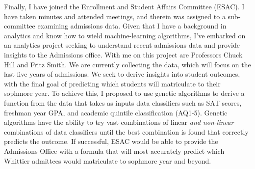 \documentclass[../main.tex]{subfiles}
\begin{document}
Finally, I have joined the Enrollment and Student Affairs Committee (ESAC).  I have taken minutes and attended meetings, and therein was assigned to a sub-committee examining admissions data.  Given that I have a background in analytics and know how to wield machine-learning algorithms, I've embarked on an analytics project seeking to understand recent admissions data and provide insights to the Admissions office.  With me on this project are Professors Chuck Hill and Fritz Smith.  We are currently collecting the data, which will focus on the last five years of admissions.  We seek to derive insights into student outcomes, with the final goal of predicting which students will matriculate to their sophmore year.  To achieve this, I proposed to use genetic algorithms to derive a function from the data that takes as inputs data classifiers such as SAT scores, freshman year GPA, and academic quintile classification (AQ1-5).  Genetic algorithms have the ability to try vast combinations of linear \textit{and non-linear} combinations of data classifiers until the best combination is found that correctly predicts the outcome.  If successful, ESAC would be able to provide the Admissions Office with a formula that will most accurately predict which Whittier admittees would matriculate to sophmore year and beyond.
\end{document}
